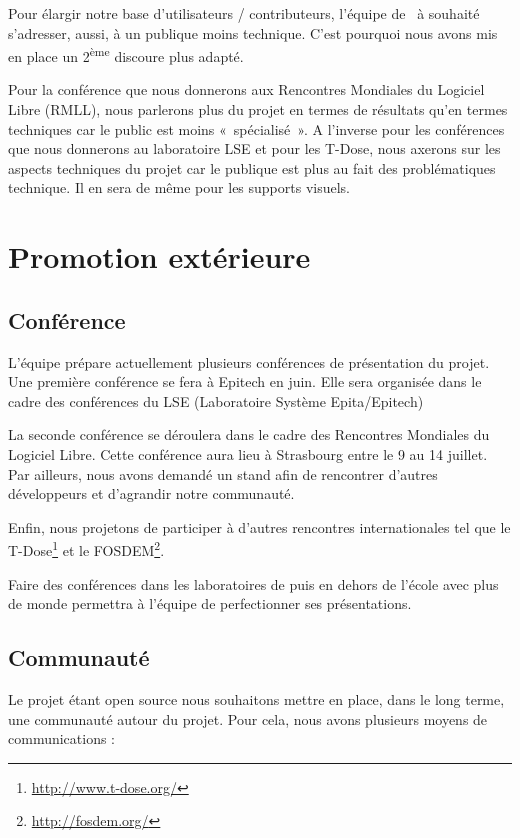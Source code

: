 \documentclass[francais]{rtxreport}
\begin{document}
Pour élargir notre base d'utilisateurs / contributeurs, l'équipe de \rtx\ à
souhaité s'adresser, aussi, à un publique moins technique. C'est pourquoi nous
avons mis en place un 2\textsuperscript{ème} discoure plus adapté.

Pour la conférence que nous donnerons aux Rencontres Mondiales du Logiciel
Libre (RMLL), nous parlerons plus du projet en termes de résultats qu'en termes
techniques car le public est moins «~spécialisé~». A l'inverse pour les
conférences que nous donnerons au laboratoire LSE et pour les T-Dose, nous
axerons sur les aspects techniques du projet car le publique est plus au fait
des problématiques technique. Il en sera de même pour les supports visuels.

\chapter{Promotion extérieure}

\section{Conférence}

L'équipe prépare actuellement plusieurs conférences de présentation du projet.
Une première conférence se fera à Epitech en juin. Elle sera organisée dans le
cadre des conférences du LSE (Laboratoire Système Epita/Epitech)

La seconde conférence se déroulera dans le cadre des Rencontres Mondiales du
Logiciel Libre. Cette conférence aura lieu à Strasbourg entre le 9 au 14
juillet. Par ailleurs, nous avons demandé un stand afin de rencontrer d'autres
développeurs et d'agrandir notre communauté.

Enfin, nous projetons de participer à d'autres rencontres internationales tel
que le T-Dose\footnote{\url{http://www.t-dose.org/}} et le FOSDEM\footnote{\url{http://fosdem.org/}}.

Faire des conférences dans les laboratoires de puis en dehors de l'école avec
plus de monde permettra à l'équipe de perfectionner ses présentations.

\section{Communauté}

Le projet étant open source nous souhaitons mettre en place, dans le long terme,
une communauté autour du projet. Pour cela, nous avons plusieurs
moyens de communications :
\end{document}
